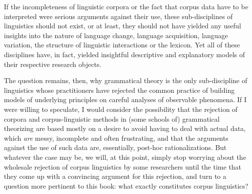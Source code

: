 If the incompleteness of linguistic corpora or the fact that corpus data have to be interpreted were serious arguments against their use, these sub\hyp{}disciplines of linguistics should not exist, or at least, they should not have yielded any useful insights into the nature of language change, language acquisition,  language variation,  the structure of linguistic interactions or the lexicon.  Yet all of these disciplines have, in fact, yielded insightful descriptive  and explanatory  models of their respective research objects.

The question remains, then, why grammatical theory is the only sub\hyp{}discipline of linguistics whose practitioners have rejected the common practice of building models of underlying principles on careful analyses of observable phenomena. If I were willing to speculate, I would consider the possibility that the rejection of corpora and corpus\hyp{}linguistic methods in (some schools of) grammatical theorizing are based mostly on a desire to avoid having to deal with actual data, which \textit{are} messy, incomplete and often frustrating, and that the arguments against the use of such data are, essentially, post\hyp{}hoc rationalizations. But whatever the case may be, we will, at this point, simply stop worrying about the wholesale rejection of corpus linguistics by some researchers until the time that they come up with a convincing argument for this rejection, and turn to a question more pertinent to this book: what exactly constitutes corpus linguistics?

